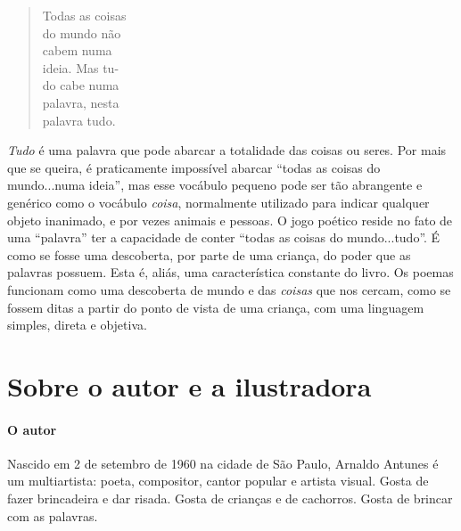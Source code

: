 \documentclass[11pt]{extarticle}
\begin{document}
\begin{verse}
Todas as coisas\\
do mundo não\\
cabem numa\\
ideia. Mas tu-\\
do cabe numa\\
palavra, nesta\\
palavra tudo.\\
\end{verse}

\textit{Tudo} é uma palavra que pode abarcar a totalidade das coisas ou seres. Por mais
que se queira, é praticamente impossível abarcar ``todas as coisas do mundo...numa ideia'',
mas esse vocábulo pequeno pode ser tão abrangente e genérico como o vocábulo \textit{coisa},
normalmente utilizado para indicar qualquer objeto inanimado, e por vezes animais e pessoas. 
O jogo poético reside no fato de uma ``palavra'' ter a capacidade de conter ``todas
as coisas do mundo...tudo''. É como se fosse uma descoberta, por parte de uma criança, do
poder que as palavras possuem. Esta é, aliás, uma característica constante do livro. Os
poemas funcionam como uma descoberta de mundo e das \textit{coisas} que nos cercam, como
se fossem ditas a partir do ponto de vista de uma criança, com uma linguagem simples,
direta e objetiva.


\reversemarginpar
\marginparwidth=5cm



\section{Sobre o autor e a ilustradora}

\paragraph{O autor}


Nascido em 2 de setembro de 1960 na cidade de São Paulo, Arnaldo Antunes é um multiartista: 
poeta, compositor, cantor popular e artista visual.
Gosta de fazer brincadeira e dar risada. Gosta de crianças e de cachorros.
Gosta de brincar com as palavras.
\end{document}
